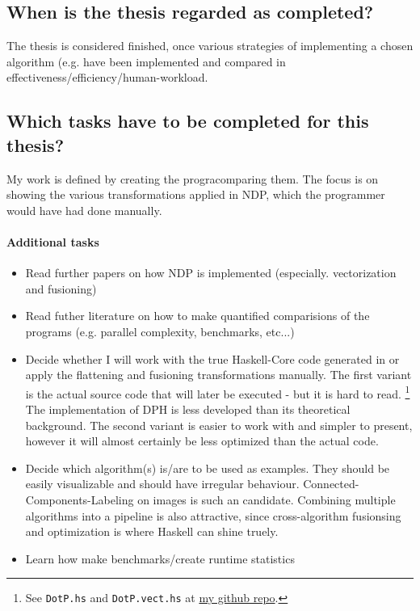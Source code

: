 \message{ !name(expose.tex)}\documentclass{article}
\begin{document}
    \subsection{When is the thesis regarded as completed?}
    The thesis is considered finished, once various strategies of
    implementing a chosen algorithm (e.g.  have been
    implemented and compared in effectiveness/efficiency/human-workload.

    \subsection{Which tasks have to be completed for this thesis?}
    My work is defined by creating the progracomparing them.
    The focus is on showing the various transformations applied in NDP, which the programmer would have had done manually.













    \paragraph{Additional tasks}
        \begin{itemize}
            \item Read further papers on how NDP is implemented (especially. vectorization and fusioning)
            \item Read futher literature on how to make quantified comparisions of the programs (e.g. parallel complexity, benchmarks, etc...)
            \item Decide whether I will work with the true Haskell-Core code generated in    or apply the flattening and fusioning transformations manually.
                The first variant is the actual source code that will later be executed - but it is hard to read. \footnote[1]{See \texttt{DotP.hs} and \texttt{DotP.vect.hs} at \href{https://github.com/GollyTicker/Nested-Data-Parallel-Haskell/tree/0e8d3df0d8084a01b007b27debda2b64247a254d}{my github repo}. }
                The implementation of DPH is less developed than its theoretical background.
                The second variant is easier to work with and simpler to present, however it will almost certainly be less optimized than the actual code.
            \item Decide which algorithm(s) is/are to be used as examples. They should be easily visualizable and should have irregular behaviour.
                Connected-Components-Labeling on images is such an candidate. Combining multiple algorithms into
                a pipeline is also attractive, since cross-algorithm fusionsing and optimization is where Haskell can shine truely.
            \item Learn how make benchmarks/create runtime statistics
        \end{itemize}
\end{document}
